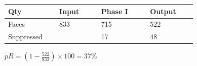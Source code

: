 \begin{enumerate}
\begin{minipage}[c]{0.6\linewidth}
\begin{tabular}[h]{@{} p{0.22\linewidth} p{0.18\linewidth} p{0.21\linewidth} p{0.2\linewidth} @{}}\toprule
\textbf{Qty} & \textbf{Input} & \textbf{Phase I} & \textbf{Output}\\  \midrule
Faces  & 833 & 715 & 522\\
Suppressed  &  &17 & 48\\
\bottomrule
\end{tabular}
\end{minipage}
\begin{minipage}[c]{0.38\linewidth}
$pR = (1 - \frac{522}{833}) \times 100 = 37\%$
\end{minipage}
\end{enumerate}
